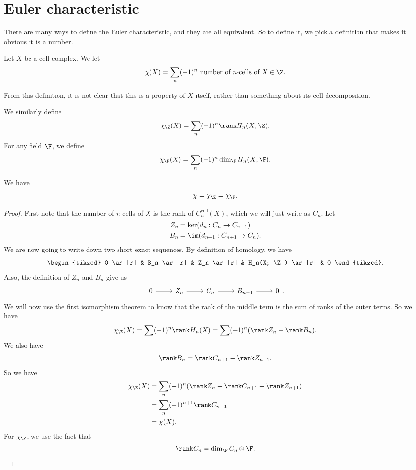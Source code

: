 \documentclass[a4paper]{article}
\theoremstyle{definition}
\begin{document}
\section{Euler characteristic}
There are many ways to define the Euler characteristic, and they are all equivalent. So to define it, we pick a definition that makes it obvious it is a number.
\begin{defi}
  Let $X$ be a cell complex. We let
  \[
    \chi(X) = \sum_n (-1)^n \text{ number of $n$-cells of $X$} \in \Z.
  \]
\end{defi}
From this definition, it is not clear that this is a property of $X$ itself, rather than something about its cell decomposition.

We similarly define
\[
  \chi_{\Z}(X) = \sum_n (-1)^n \rank H_n(X; \Z).
\]
For any field $\F$, we define
\[
  \chi_{\F}(X) = \sum_n (-1)^n \dim_\F H_n(X; \F).
\]
\begin{thm}
  We have
  \[
    \chi = \chi_\Z = \chi_\F.
  \]
\end{thm}

\begin{proof}
  First note that the number of $n$ cells of $X$ is the rank of $C_n^{\mathrm{cell}}(X)$, which we will just write as $C_n$. Let
  \begin{align*}
    Z_n &= \ker (d_n: C_n \to C_{n - 1})\\
    B_n &= \im (d_{n + 1}: C_{n + 1} \to C_n).
  \end{align*}
  We are now going to write down two short exact sequences. By definition of homology, we have
  \[
    \begin{tikzcd}
      0 \ar[r] & B_n \ar[r] & Z_n \ar[r] & H_n(X; \Z) \ar[r] & 0
    \end{tikzcd}.
  \]
  Also, the definition of $Z_n$ and $B_n$ give us
  \[
    \begin{tikzcd}
      0 \ar[r] & Z_n \ar[r] & C_n \ar[r] & B_{n - 1} \ar[r] & 0
    \end{tikzcd}.
  \]
  We will now use the first isomorphism theorem to know that the rank of the middle term is the sum of ranks of the outer terms. So we have
  \[
    \chi_\Z(X) = \sum (-1)^n \rank H_n(X) = \sum(-1)^n (\rank Z_n - \rank B_n).
  \]
  We also have
  \[
    \rank B_n = \rank C_{n + 1} - \rank Z_{n + 1}.
  \]
  So we have
  \begin{align*}
    \chi_\Z(X) &= \sum_n (-1)^n (\rank Z_n - \rank C_{n + 1} + \rank Z_{n + 1}) \\
    &= \sum_n (-1)^{n + 1} \rank C_{n + 1}\\
    &= \chi(X).
  \end{align*}
  For $\chi_\F$, we use the fact that
  \[
    \rank C_n = \dim_{\F} C_n \otimes \F.
  \]
\end{proof}
\end{document}
